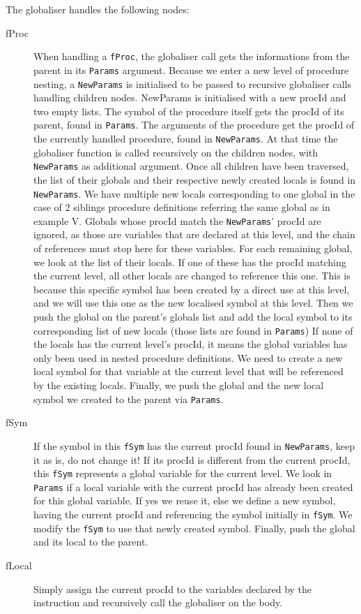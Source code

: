 \documentclass[a4paper]{memoir}
\begin{document}
The globaliser handles the following nodes:
\begin{description}
   \item[fProc] When handling a \lstinline!fProc!, the globaliser call gets the informations from the parent in its \lstinline!Params! argument. Because we enter a new level of procedure nesting, a \lstinline!NewParams! is initialised to be passed to recursive globaliser calls handling children nodes. NewParams is initialised with a new procId and two empty lists. 
      The symbol of the procedure itself gets the procId of its parent, found in \lstinline!Params!. The arguments of the procedure get the procId of the currently handled procedure, found in \lstinline!NewParams!. At that time the globaliser function is called recursively on the children nodes, with \lstinline!NewParams! as additional argument.
      Once all children have been traversed, the list of their globals and their respective newly created locals is found in \lstinline!NewParams!.  We have multiple new locals corresponding to one global in the case of 2 siblings procedure definitions referring the same global as in example V. 
      Globals whose procId match the \lstinline!NewParams!' procId are ignored, as those are variables that are declared at this level, and the chain of references must stop here for these variables.
      For each remaining global, we look at the list of their locals. 
      If one of these has the procId matching the current level, all other locals are changed to reference this one. This is because this specific symbol has been created by a direct use at this level, and we will use this one as the new localised symbol at this level. Then we push the global on the parent's globals list and add the local symbol to its corresponding list of new locals (those lists are found in \lstinline!Params!)
      If none of the locals has the current level's procId, it means the global variables has only been used in nested procedure definitions. We need to create a new local symbol for that variable at the current level that will be referenced by the existing locals. Finally, we push the global and the new local symbol we created to the parent via \lstinline!Params!. 
   \item[fSym] If the symbol in this \lstinline!fSym! has the current procId found in \lstinline!NewParams!, keep it as is, do not change it!  If its procId is different from the current procId, this \lstinline!fSym! represents a global variable for the current level. We look in \lstinline!Params! if a local variable with the current procId has already been created for this global variable. If yes we reuse it, else we define a new symbol, having the current procId and referencing the symbol initially in \lstinline!fSym!. We modify the \lstinline!fSym! to use that newly created symbol. Finally, push the global and its local to the parent.
   \item[fLocal] Simply assign the current procId to the variables declared by the instruction and recursively call the globaliser on the body.
\end{description}
\end{document}
